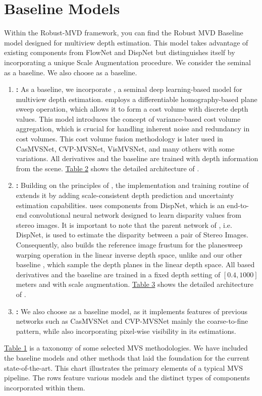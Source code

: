 \section{Baseline Models}\label{sec:baseline}
Within the Robust-MVD framework, you can find the Robust MVD Baseline model \cite{schroeppel2022benchmark} designed for multiview depth estimation. This model takes advantage of existing components from FlowNet and DispNet but distinguishes itself by incorporating a unique Scale Augmentation procedure. We consider the seminal {\mvsn}\cite{Yao2018} as a baseline. We also choose {\vmn}\cite{Zhang2020} as a baseline.
\begin{enumerate}
    \item \textbf{{\mvsn}:} As a baseline, we incorporate {\mvsn}, a seminal deep learning-based model for multiview depth estimation. {\mvsn} employs a differentiable homography-based plane sweep operation, which allows it to form a cost volume with discrete depth values. This model introduces the concept of variance-based cost volume aggregation, which is crucial for handling inherent noise and redundancy in cost volumes. This cost volume fusion methodology is later used in CasMVSNet, CVP-MVSNet, VisMVSNet, and many others with some variations. All {\mvsn} derivatives and the baseline are trained with depth information from the scene. \hyperref[tab:arch-mvsn]{Table 2} shows the detailed architecture of {\mvsn}. 
    \item \textbf{{\rmvd}:} Building on the principles of {\mvsn}, the implementation and training routine of {\rmvd} extends it by adding scale-consistent depth prediction and uncertainty estimation capabilities. {\rmvd} uses components from DispNet, which is an end-to-end convolutional neural network designed to learn disparity values from stereo images. It is important to note that the parent network of {\rmvd}, i.e. DispNet, is used to estimate the disparity between a pair of Stereo Images. Consequently, {\rmvd} also builds the reference image frustum for the planesweep warping operation in the linear inverse depth space, unlike {\mvsn} and our other baseline {\vmn}, which sample the depth planes in the linear depth space. All {\rmvd} based derivatives and the baseline are trained in a fixed depth setting of $[0.4, 1000]$ meters and with scale augmentation. \hyperref[tab:arch-rmvd]{Table 3} shows the detailed architecture of {\rmvd}. 
    \item \textbf{\vmn:} We also choose {\vmn} as a baseline model, as it implements features of previous networks such as CasMVSNet \cite{Gu2020} and CVP-MVSNet \cite{Yang2020} mainly the coarse-to-fine pattern, while also incorporating pixel-wise visibility in its estimations. 
\end{enumerate}\par
\hyperref[tab:methods-comparision]{Table 1} is a taxonomy of some selected MVS methodologies. We have included the baseline models and other methods that laid the foundation for the current state-of-the-art. This chart illustrates the primary elements of a typical MVS pipeline. The rows feature various models and the distinct types of components incorporated within them.  


